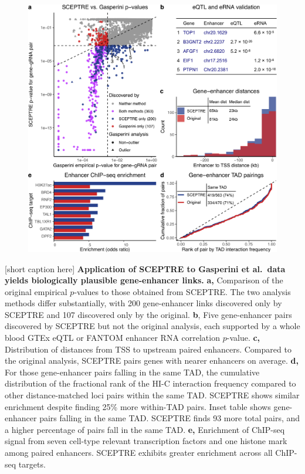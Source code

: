 \documentclass{nature}
\begin{document}
\clearpage
\begin{figure}[h!]
	\includegraphics[width = \textwidth]{figures/Figure4/Figure4_cropped.pdf}
\end{figure}
[short caption here]{
	\label{fig:application}
	\textbf{Application of SCEPTRE to Gasperini et al.\ data yields biologically plausible gene-enhancer links.} \textbf{a,} Comparison of the original empirical $p$-values to those obtained from SCEPTRE. The two analysis methods differ substantially, with 200 gene-enhancer links discovered only by SCEPTRE and 107 discovered only by the original. \textbf{b}, Five gene-enhancer pairs discovered by SCEPTRE but not the original analysis, each supported by a whole blood GTEx eQTL or FANTOM enhancer RNA correlation $p$-value. \textbf{c,} Distribution of distances from TSS to upstream paired enhancers. Compared to the original analysis, SCEPTRE pairs genes with nearer enhancers on average. \textbf{d,} For those gene-enhancer pairs falling in the same TAD, the cumulative distribution of the fractional rank of the HI-C interaction frequency compared to other distance-matched loci pairs within the same TAD. SCEPTRE shows similar enrichment despite finding 25\% more within-TAD pairs. Inset table shows gene-enhancer pairs falling in the same TAD. SCEPTRE finds 93 more total pairs, and a higher percentage of pairs fall in the same TAD. \textbf{e,} Enrichment of ChIP-seq signal from seven cell-type relevant transcription factors and one histone mark among paired enhancers. SCEPTRE exhibits greater enrichment across all ChIP-seq targets.}
\noindent\hrulefill
\end{document}
